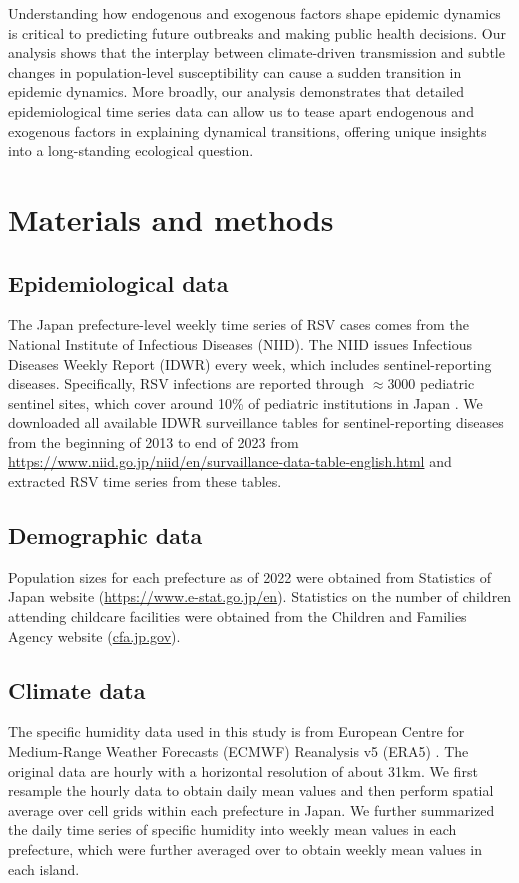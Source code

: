 \documentclass[12pt]{article}
\begin{document}
Understanding how endogenous and exogenous factors shape epidemic dynamics is critical to predicting future outbreaks and making public health decisions.
Our analysis shows that the interplay between climate-driven transmission and subtle changes in population-level susceptibility can cause a sudden transition in epidemic dynamics.
More broadly, our analysis demonstrates that detailed epidemiological time series data can allow us to tease apart endogenous and exogenous factors in explaining dynamical transitions, offering unique insights into a long-standing ecological question.

\section*{Materials and methods}

\subsection*{Epidemiological data}

The Japan prefecture-level weekly time series of RSV cases comes from the National Institute of Infectious Diseases (NIID).
The NIID issues Infectious Diseases Weekly Report (IDWR) every week, which includes sentinel-reporting diseases.
Specifically, RSV infections are reported through $\approx 3000$ pediatric sentinel sites, which cover around 10\% of pediatric institutions in Japan \citep{yamagami2019detection}.
We downloaded all available IDWR surveillance tables for sentinel-reporting diseases from the beginning of 2013 to end of 2023 from \url{https://www.niid.go.jp/niid/en/survaillance-data-table-english.html} and extracted RSV time series from these tables.

\subsection*{Demographic data}

Population sizes for each prefecture as of 2022 were obtained from Statistics of Japan website (\url{https://www.e-stat.go.jp/en}).
Statistics on the number of children attending childcare facilities were obtained from the Children and Families Agency website (\url{cfa.jp.gov}).

\subsection*{Climate data}

The specific humidity data used in this study is from European Centre for Medium-Range Weather Forecasts (ECMWF) Reanalysis v5 (ERA5) \citep{hersbach2020era5}. 
The original data are hourly with a horizontal resolution of about 31km. 
We first resample the hourly data to obtain daily mean values and then perform spatial average over cell grids within each prefecture in Japan. 
We further summarized the daily time series of specific humidity into weekly mean values in each prefecture, which were further averaged over to obtain weekly mean values in each island.
\end{document}
